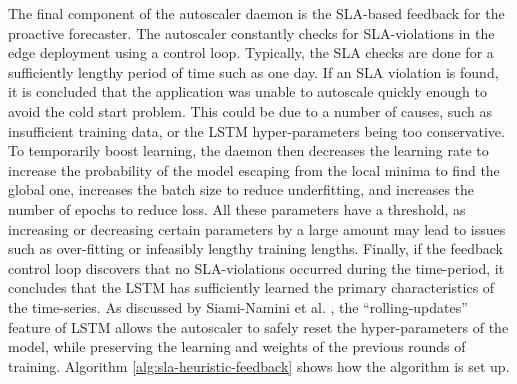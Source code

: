 The final component of the autoscaler daemon is the SLA-based feedback for the proactive forecaster. The autoscaler constantly checks for SLA-violations in the edge deployment using a control loop. Typically, the SLA checks are done for a sufficiently lengthy period of time such as one day. If an SLA violation is found, it is concluded that the application was unable to autoscale quickly enough to avoid the cold start problem. This could be due to a number of causes, such as insufficient training data, or the LSTM hyper-parameters being too conservative. To temporarily boost learning, the daemon then decreases the learning rate to increase the probability of the model escaping from the local minima to find the global one, increases the batch size to reduce underfitting, and increases the number of epochs to reduce loss. All these parameters have a threshold, as increasing or decreasing certain parameters by a large amount may lead to issues such as over-fitting or infeasibly lengthy training lengths. Finally, if the feedback control loop discovers that no SLA-violations occurred during the time-period, it concludes that the LSTM has sufficiently learned the primary characteristics of the time-series. As discussed by Siami-Namini et al. \cite{siami2018comparison}, the ``rolling-updates'' feature of LSTM allows the autoscaler to safely reset the hyper-parameters of the model, while preserving the learning and weights of the previous rounds of training. Algorithm \ref{alg:sla-heuristic-feedback} shows how the algorithm is set up.\par